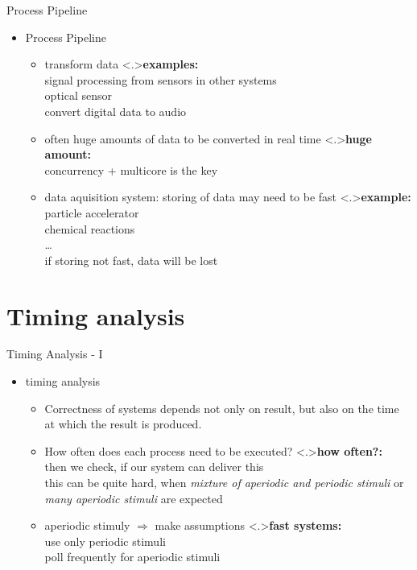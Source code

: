 \documentclass[ngerman={babel}, utf8, bigger, xcolor={table,dvipsnames}, ompress, hyperref={bookmarks,colorlinks}]{beamer}
\begin{document}
\begin{frame}{Process Pipeline}
	\begin{itemize}
		\item Process Pipeline
		\begin{itemize}
			\item transform data
			\note<.>{\textbf{examples:}\\ signal processing from sensors in other systems \\ optical sensor \\ convert digital data to audio}
			\item often huge amounts of data to be converted in real time
			\note<.>{\textbf{huge amount:}\\ concurrency + multicore is the key}
			\item data aquisition system: storing of data may need to be fast
			\note<.>{\textbf{example:}\\ particle accelerator \\ chemical reactions \\ \dots \\ if storing not fast, data will be lost}
		\end{itemize}
	\end{itemize}
\end{frame}

\section{Timing analysis}
\begin{frame}{Timing Analysis - I}
	\begin{itemize}
		\item timing analysis
		\begin{itemize}
			\item Correctness of systems depends not only on result, but also on the time at which the result is produced.
			\item How often does each process need to be executed?
			\note<.>{\textbf{how often?:}\\ then we check, if our system can deliver this \\ this can be quite hard, when \emph{mixture of aperiodic and periodic stimuli} or \emph{many aperiodic stimuli} are expected}
			\item aperiodic stimuly $\Rightarrow$ make assumptions
			\note<.>{\textbf{fast systems:}\\ use only periodic stimuli \\ poll frequently for aperiodic stimuli}
		\end{itemize}
	\end{itemize}
\end{frame}
\end{document}
